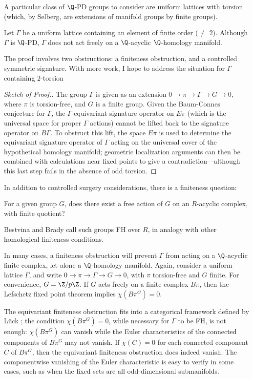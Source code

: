   A particular class of $\Q$-PD groups to consider are uniform lattices with torsion (which, by Selberg, are extensions of manifold groups by finite groups).
  \begin{theorem}[Fowler]
    Let $\Gamma$ be a uniform lattice containing an element of finite order ($\neq$ 2).  Although $\Gamma$ is $\Q$-PD, $\Gamma$ does not act freely on a $\Q$-acyclic $\Q$-homology manifold.
  \end{theorem}
  The proof involves two obstructions: a finiteness obstruction, and a controlled symmetric signature.  With more work, I hope to address the situation for $\Gamma$ containing $2$-torsion
  \begin{proof}[Sketch of Proof:]
    The group $\Gamma$ is given as an extension $0 \to \pi \to \Gamma \to G \to 0$, where $\pi$ is torsion-free, and $G$ is a finite group.  Given the Baum-Connes conjecture for $\Gamma$, the $\Gamma$-equivariant signature operator on $E\pi$ (which is the universal space for proper $\Gamma$ actions) cannot be lifted back to the signature operator on $B\Gamma$.  To obstruct this lift, the space $E\pi$ is used to determine the equivariant signature operator of $\Gamma$ acting on the universal cover of the hypothetical homology manifold; geometric localization arguments can then be combined with calculations near fixed points to give a contradiction---although this last step fails in the absence of odd torsion.
  \end{proof}

  In addition to controlled surgery considerations, there is a finiteness question:
  \begin{question}
  For a given group $G$, does there exist a free action of $G$ on an $R$-acyclic complex, with finite quotient?
  \end{question}
  Bestvina and Brady \cite{MR1465330} call such groups FH over $R$, in analogy with other homological finiteness conditions.

  In many cases, a finiteness obstruction will prevent $\Gamma$ from acting on a $\Q$-acyclic finite complex, let alone a $\Q$-homology manifold.  Again, consider a uniform lattice $\Gamma$, and write $0 \to \pi \to \Gamma \to G \to 0$, with $\pi$ torsion-free and $G$ finite.  For convenience, $G = \Z/p\Z$.  If $G$ acts freely on a finite complex $B\pi$, then the Lefschetz fixed point theorem implies $\chi(B\pi^G) = 0$.

  The equivariant finiteness obstruction fits into a categorical framework defined by L\"uck \cite{MR1027600}; the condition $\chi(B\pi^G) = 0$, while necessary for $\Gamma$ to be FH, is not enough: $\chi(B\pi^G)$ can vanish while the Euler characteristics of the connected components of $B\pi^G$ may not vanish.  If $\chi(C) = 0$ for each connected component $C$ of $B\pi^G$, then the equivariant finiteness obstruction does indeed vanish.  The componentwise vanishing of the Euler characteristic is easy to verify in some cases, such as when the fixed sets are all odd-dimensional submanifolds.
